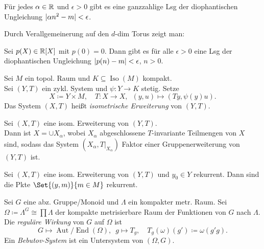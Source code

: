 \documentclass{cheat-sheet}
\DeclareMathOperator{\Aut}{Aut} %
\DeclareMathOperator{\End}{End} %
\newcommand{\AutEnd}{\Aut\!/\!\End} %
\DeclareMathOperator{\Iso}{Iso} %
\begin{document}
\begin{prop}
  Für jedes $\alpha \in \mathbb{R}$ und $\epsilon > 0$ gibt es eine ganzzahlige Lsg der diophantischen Ungleichung
  $\lvert\alpha n^2 - m\rvert < \epsilon$.
\end{prop}

\begin{bem}
  Durch Verallgemeinerung auf den $d$-dim Torus zeigt man:
\end{bem}

\begin{prop}
  Sei $p(X) \in \mathbb{R}[X]$ mit $p(0) = 0$. Dann gibt es für alle $\epsilon > 0$ eine Lsg der diophantischen Ungleichung
  $\lvert p(n) - m\rvert < \epsilon$, $n > 0$.
\end{prop}

\begin{defn}
  Sei $M$ ein topol. Raum und $K \subseteq \Iso(M)$ kompakt. \\
  Sei $(Y, T)$ ein zykl. System und $\psi : Y \to K$ stetig. Setze
  \[
    X \coloneqq Y \!\times\! M, \quad
    T : X \to X, \enspace (y, u) \mapsto (Ty, \psi(y)u).
  \]
  Das System $(X, T)$ heißt \emph{isometrische Erweiterung} von $(Y, T)$.
\end{defn}

\begin{prop}
  Sei $(X, T)$ eine isom. Erweiterung von $(Y, T)$. \\
  Dann ist $X = \cup X_\alpha$, wobei $X_\alpha$ abgeschlossene $T$-invariante Teilmengen von $X$ sind, sodass das System $(X_\alpha, T|_{X_\alpha})$ Faktor einer Gruppenerweiterung von $(Y, T)$ ist.
\end{prop}

\begin{prop}
  Sei $(X, T)$ eine isom. Erweiterung von $(Y, T)$ und $y_0 \in Y$ rekurrent.
  Dann sind die Pkte $\Set{(y, m)}{m \in M}$ rekurrent.
\end{prop}


\begin{defn}
  Sei $G$ eine abz. Gruppe/Monoid und $\Lambda$ ein kompakter metr. Raum.
  Sei $\Omega \coloneqq \Lambda^G \cong \prod \Lambda$ der kompakte metrisierbare Raum der Funktionen von $G$ nach $\Lambda$. Die \emph{reguläre Wirkung} von $G$ auf $\Omega$ ist
  \[
    G \mapsto \AutEnd(\Omega), \enspace g \mapsto T_g, \quad
    T_g(\omega)(g') \coloneqq \omega(g'g).
  \]
  Ein \emph{Bebutov-System} ist ein Untersystem von $(\Omega, G)$.
\end{defn}
\end{document}
